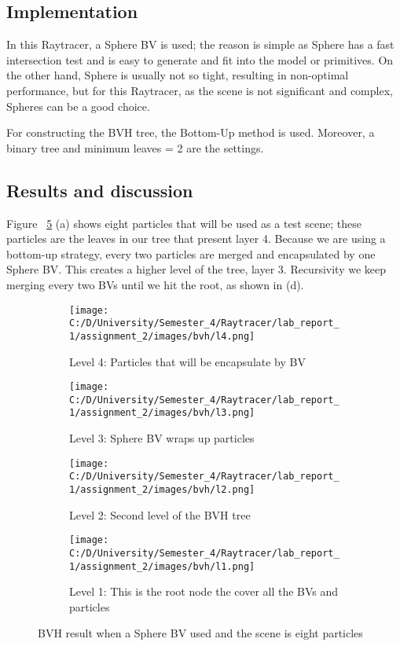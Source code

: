\documentclass{article}
\begin{document}
	\subsection{Implementation}
	
	In this Raytracer, a Sphere BV is used; the reason is simple as Sphere has a fast intersection test and is easy to generate and fit into the model or primitives. 
	On the other hand, Sphere is usually not so tight, resulting in non-optimal performance, but for this Raytracer, as the scene is not significant and complex, Spheres can be a good choice.
	
	For constructing the BVH tree, the Bottom-Up method is used. Moreover, a binary tree and minimum leaves = 2 are the settings.
	
	\subsection{Results and discussion}
	
	Figure ~\ref{fig:12} (a) shows eight particles that will be used as a test scene; these particles are the leaves in our tree that present layer 4. Because we are using a bottom-up strategy, every two particles are merged and encapsulated by one Sphere BV. This creates a higher level of the tree, layer 3. Recursivity we keep merging every two BVs until we hit the root, as shown in (d).
	
	\begin{figure}[ht]
		\begin{center}
			\begin{subfigure}{.3\textwidth}
				\centering
				\texttt{[image: C:/D/University/Semester\_4/Raytracer/lab\_report\_1/assignment\_2/images/bvh/l4.png]}  
				\caption{Level 4: Particles that will be encapsulate by BV}
				\label{fig:sub-first}
			\end{subfigure}
			\begin{subfigure}{.3\textwidth}
				\centering
				\texttt{[image: C:/D/University/Semester\_4/Raytracer/lab\_report\_1/assignment\_2/images/bvh/l3.png]}  
				\caption{Level 3: Sphere BV wraps up particles}
				\label{fig:sub-second}
			\end{subfigure}
			\begin{subfigure}{.3\textwidth}
				\centering
				\texttt{[image: C:/D/University/Semester\_4/Raytracer/lab\_report\_1/assignment\_2/images/bvh/l2.png]}  
				\caption{Level 2: Second level of the BVH tree}
				\label{fig:sub-third}
			\end{subfigure}
			\begin{subfigure}{.3\textwidth}
				\centering
				\texttt{[image: C:/D/University/Semester\_4/Raytracer/lab\_report\_1/assignment\_2/images/bvh/l1.png]}  
				\caption{Level 1: This is the root node the cover all the BVs and particles}
				\label{fig:sub-forth}
			\end{subfigure}
			\caption{BVH result when a Sphere BV used and the scene is eight particles}
			\label{fig:12}
		\end{center}
	\end{figure}
	
\end{document}
